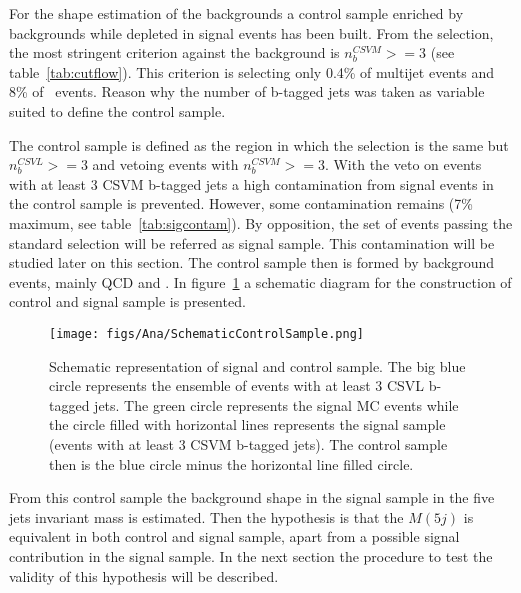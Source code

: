 For the shape estimation of the backgrounds a control sample enriched by backgrounds while depleted in signal events has been built. From the selection, the most stringent criterion against the background is $n_{b}^{CSVM}>=3$ (see table~\ref{tab:cutflow}). This criterion is selecting only 0.4\% of multijet events and 8\% of \ttbar~events. Reason  why the number of b-tagged jets was taken as variable suited to define the control sample. %

The control sample is defined as the region in which  the selection is the same but $n_{b}^{CSVL}>=3$ and vetoing events with $n_{b}^{CSVM}>=3$. With the veto on events with at least 3 CSVM b-tagged jets a high contamination from signal events in the control sample is prevented. However, some contamination remains (7\% maximum, see table~\ref{tab:sigcontam}). By opposition, the set of events passing the standard selection will be referred as signal sample.  This contamination will be studied later on this section. The control sample then is formed by background events, mainly QCD and \ttbar. In figure~\ref{fig:CSSSSche} a schematic diagram for the construction of control and signal sample is presented.

\begin{figure}[!Hhtbp]
  \begin{center}
    \texttt{[image: figs/Ana/SchematicControlSample.png]}
    \caption{Schematic representation of signal and control sample. The big blue circle represents the ensemble of events with at least 3 CSVL b-tagged jets. The green circle represents the signal MC events while the circle filled with horizontal lines represents the signal sample (events with at least 3 CSVM b-tagged jets). The control sample then is the blue circle minus the horizontal line filled circle.}
    \label{fig:CSSSSche}
  \end{center}
\end{figure}

From this control sample the background shape in the signal sample in the five jets invariant mass is estimated. Then the hypothesis is that the $M(5j)$ is equivalent in both control and signal sample, apart from a possible signal contribution in the signal sample. In the next section the procedure to test the validity of this hypothesis will be described. 

